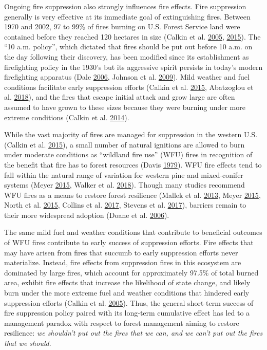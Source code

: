 \documentclass[twoside,12pt,final]{ucthesis-CA2012}
\begin{document}
\begin{ucmainmatter}
Ongoing fire suppression also strongly influences fire effects. Fire
suppression generally is very effective at its immediate goal of
extinguishing fires. Between 1970 and 2002, 97 to 99\% of fires burning
on U.S. Forest Service land were contained before they reached 120
hectares in size (Calkin et al.
\protect\hyperlink{ref-calkin2005}{2005},
\protect\hyperlink{ref-calkin2015}{2015}). The ``10 a.m. policy'', which
dictated that fires should be put out before 10 a.m. on the day
following their discovery, has been modified since its establishment as
firefighting policy in the 1930's but its aggressive spirit persists in
today's modern firefighting apparatus (Dale
\protect\hyperlink{ref-dale2006}{2006}, Johnson et al.
\protect\hyperlink{ref-johnson2009}{2009}). Mild weather and fuel
conditions facilitate early suppression efforts (Calkin et al.
\protect\hyperlink{ref-calkin2015}{2015}, Abatzoglou et al.
\protect\hyperlink{ref-abatzoglou2018a}{2018}), and the fires that
escape initial attack and grow large are often assumed to have grown to
these sizes because they were burning under more extreme conditions
(Calkin et al. \protect\hyperlink{ref-calkin2014}{2014}).

While the vast majority of fires are managed for suppression in the
western U.S. (Calkin et al. \protect\hyperlink{ref-calkin2015}{2015}), a
small number of natural ignitions are allowed to burn under moderate
conditions as ``wildland fire use'' (WFU) fires in recognition of the
benefit that fire has to forest resources (Davis
\protect\hyperlink{ref-davis1979}{1979}). WFU fire effects tend to fall
within the natural range of variation for western pine and mixed-conifer
systems (Meyer \protect\hyperlink{ref-meyer2015}{2015}, Walker et al.
\protect\hyperlink{ref-walker2018}{2018}). Though many studies recommend
WFU fires as a means to restore forest resilience (Mallek et al.
\protect\hyperlink{ref-mallek2013}{2013}, Meyer
\protect\hyperlink{ref-meyer2015}{2015}, North et al.
\protect\hyperlink{ref-north2015}{2015}, Collins et al.
\protect\hyperlink{ref-collins2017}{2017}, Stevens et al.
\protect\hyperlink{ref-stevens2017}{2017}), barriers remain to their
more widespread adoption (Doane et al.
\protect\hyperlink{ref-doane2006}{2006}).

The same mild fuel and weather conditions that contribute to beneficial
outcomes of WFU fires contribute to early success of suppression
efforts. Fire effects that may have arisen from fires that succumb to
early suppression efforts never materialize. Instead, fire effects from
suppression fires in this ecosystem are dominated by large fires, which
account for approximately 97.5\% of total burned area, exhibit fire
effects that increase the likelihood of state change, and likely burn
under the more extreme fuel and weather conditions that hindered early
suppression efforts (Calkin et al.
\protect\hyperlink{ref-calkin2005}{2005}). Thus, the general short-term
success of fire suppression policy paired with its long-term cumulative
effect has led to a management paradox with respect to forest management
aiming to restore resilience: \emph{we shouldn't put out the fires that
we can, and we can't put out the fires that we should}.


\end{ucmainmatter}
\end{document}
